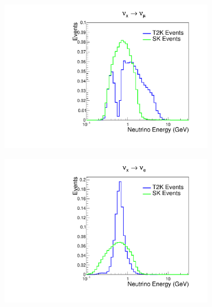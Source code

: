 \begin{figure}[h]
  \begin{subfigure}[t]{0.49\textwidth}
    \includegraphics[width=\textwidth, trim={0mm 0mm 0mm 0mm}, clip,page=1]{Figures/Selections/NeutrinoEnergyDist_Comp_1Rmu_NuMu.pdf}
  \end{subfigure}%
  \begin{subfigure}[t]{0.49\textwidth}
    \includegraphics[width=\textwidth, trim={0mm 0mm 0mm 0mm}, clip,page=1]{Figures/Selections/NeutrinoEnergyDist_Comp_1Re_NuE.pdf}
  \end{subfigure}
  \begin{subfigure}[t]{0.49\textwidth}

\end{subfigure}
\end{figure}
